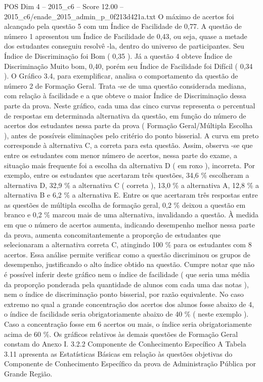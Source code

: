 \begin{textsample}{POS Dim 4 – 2015\_c6 – Score 12.00 – 2015\_c6/enade\_2015\_admin\_p\_0f213d421a.txt}
O máximo de acertos foi alcançado pela questão 5 com um Índice de Facilidade de 0,77.
A questão de número 1 apresentou um Índice de Facilidade de 0,43, ou seja, quase a metade dos estudantes conseguiu resolvê -la, dentro do universo de participantes.
Seu Índice de Discriminação foi Bom ( 0,35 ).
Já a questão 4 obteve Índice de Discriminação Muito bom, 0,40, porém seu Índice de Facilidade foi Difícil ( 0,34 ).
O Gráfico 3.4, para exemplificar, analisa o comportamento da questão de número 2 de Formação Geral.
Trata -se de uma questão considerada mediana, com relação à facilidade e a que obteve o maior Índice de Discriminação dessa parte da prova.
Neste gráfico, cada uma das cinco curvas representa o percentual de respostas em determinada alternativa da questão, em função do número de acertos dos estudantes nessa parte da prova ( Formação Geral/Múltipla Escolha ), antes de possíveis eliminações pelo critério do ponto bisserial.
A curva em preto corresponde à alternativa C, a correta para esta questão.
Assim, observa -se que entre os estudantes com menor número de acertos, nessa parte do exame, a situação mais frequente foi a escolha da alternativa D ( em roxo ), incorreta.
Por exemplo, entre os estudantes que acertaram três questões, 34,6 \% escolheram a alternativa D, 32,9 \% a alternativa C ( correta ), 13,0 \% a alternativa A, 12,8 \% a alternativa B e 6,2 \% a alternativa E.
Entre os que acertaram três respostas entre as questões de múltipla escolha de formação geral, 0,2 \% deixou a questão em branco e 0,2 \% marcou mais de uma alternativa, invalidando a questão.
À medida em que o número de acertos aumenta, indicando desempenho melhor nessa parte da prova, aumenta concomitantemente a proporção de estudantes que selecionaram a alternativa correta C, atingindo 100 \% para os estudantes com 8 acertos.
Essa análise permite verificar como a questão discriminou os grupos de desempenho, justificando o alto índice obtido na questão.
Cumpre notar que não é possível inferir deste gráfico nem o índice de facilidade ( que seria uma média da proporção ponderada pela quantidade de alunos com cada uma das notas ), nem o índice de discriminação ponto bisserial, por razão equivalente.
No caso extremo no qual a grande concentração dos acertos dos alunos fosse abaixo de 4, o índice de facilidade seria obrigatoriamente abaixo de 40 \% ( neste exemplo ).
Caso a concentração fosse em 6 acertos ou mais, o índice seria obrigatoriamente acima de 60 \%.
Os gráficos relativos às demais questões de Formação Geral constam do Anexo I. 3.2.2 Componente de Conhecimento Específico A Tabela 3.11 apresenta as Estatísticas Básicas em relação às questões objetivas do Componente de Conhecimento Específico da prova de Administração Pública por Grande Região.

\end{textsample}
